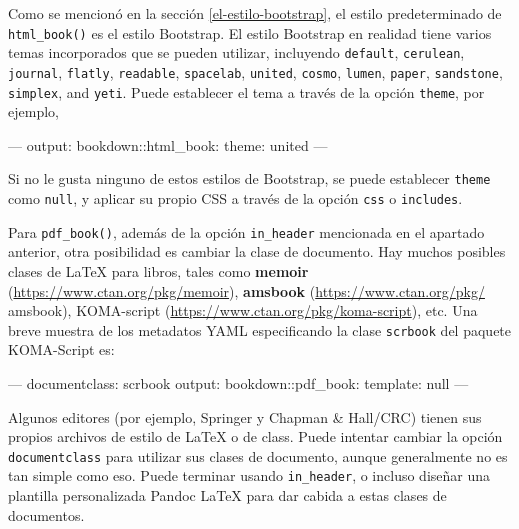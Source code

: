 \documentclass[12pt,]{krantz}
\makeatletter
\newenvironment{Shaded}{\begin{snugshade}}{\end{snugshade}}
\newcommand{\DataTypeTok}[1]{\textcolor[rgb]{0.13,0.29,0.53}{#1}}
\newcommand{\OtherTok}[1]{\textcolor[rgb]{0.56,0.35,0.01}{#1}}
\newcommand{\FunctionTok}[1]{\textcolor[rgb]{0.00,0.00,0.00}{#1}}
\newcommand{\AttributeTok}[1]{\textcolor[rgb]{0.77,0.63,0.00}{#1}}
\newenvironment{kframe}{%
\medskip{}
\setlength{\fboxsep}{.8em}
 \def\at@end@of@kframe{}%
 \ifinner\ifhmode%
  \def\at@end@of@kframe{\end{minipage}}%
  \begin{minipage}{\columnwidth}%
 \fi\fi%
 \def\FrameCommand##1{\hskip\@totalleftmargin \hskip-\fboxsep
 \colorbox{shadecolor}{##1}\hskip-\fboxsep
     \hskip-\linewidth \hskip-\@totalleftmargin \hskip\columnwidth}%
 \MakeFramed {\advance\hsize-\width
   \@totalleftmargin\z@ \linewidth\hsize
   \@setminipage}}%
 {\par\unskip\endMakeFramed%
 \at@end@of@kframe}
\renewenvironment{Shaded}{\begin{kframe}}{\end{kframe}}
\theoremstyle{definition}
\theoremstyle{definition}
\theoremstyle{definition}
\theoremstyle{remark}
\makeatother
\begin{document}
Como se mencionó en la sección \ref{el-estilo-bootstrap}, el estilo
predeterminado de \texttt{html\_book()} es el estilo Bootstrap. El
estilo Bootstrap en realidad tiene varios temas incorporados que se
pueden utilizar, incluyendo \texttt{default}, \texttt{cerulean},
\texttt{journal}, \texttt{flatly}, \texttt{readable}, \texttt{spacelab},
\texttt{united}, \texttt{cosmo}, \texttt{lumen}, \texttt{paper},
\texttt{sandstone}, \texttt{simplex}, and \texttt{yeti}. Puede
establecer el tema a través de la opción \texttt{theme}, por ejemplo,

\begin{Shaded}
\begin{Highlighting}[]
\OtherTok{---}
\FunctionTok{output:}
  \FunctionTok{bookdown:}\AttributeTok{:html_book:}
    \FunctionTok{theme:}\AttributeTok{ united}
\OtherTok{---}
\end{Highlighting}
\end{Shaded}

Si no le gusta ninguno de estos estilos de Bootstrap, se puede
establecer \texttt{theme} como \texttt{null}, y aplicar su propio CSS a
través de la opción \texttt{css} o \texttt{includes}.

Para \texttt{pdf\_book()}, además de la opción \texttt{in\_header}
mencionada en el apartado anterior, otra posibilidad es cambiar la clase
de documento. Hay muchos posibles clases de LaTeX para libros, tales
como \textbf{memoir} (\url{https://www.ctan.org/pkg/memoir}),
\textbf{amsbook} (\url{https://www.ctan.org/pkg/} amsbook), KOMA-script
(\url{https://www.ctan.org/pkg/koma-script}), etc. Una breve muestra de
los metadatos YAML especificando la clase \texttt{scrbook} del paquete
KOMA-Script es:

\begin{Shaded}
\begin{Highlighting}[]
\OtherTok{---}
\FunctionTok{documentclass:}\AttributeTok{ scrbook}
\FunctionTok{output:}
  \FunctionTok{bookdown:}\AttributeTok{:pdf_book:}
    \FunctionTok{template:}\AttributeTok{ }\DataTypeTok{null}
\OtherTok{---}
\end{Highlighting}
\end{Shaded}

Algunos editores (por ejemplo, Springer y Chapman \& Hall/CRC) tienen
sus propios archivos de estilo de LaTeX o de class. Puede intentar
cambiar la opción \texttt{documentclass} para utilizar sus clases de
documento, aunque generalmente no es tan simple como eso. Puede terminar
usando \texttt{in\_header}, o incluso diseñar una plantilla
personalizada Pandoc LaTeX para dar cabida a estas clases de documentos.
\end{document}
